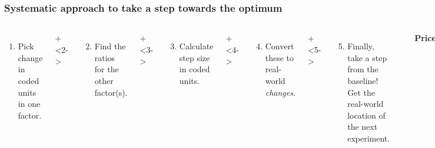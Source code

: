 \begin{frame}\frametitle{Systematic approach to take a step towards the optimum}
	\begin{columns}[T]
		
			\vspace{0.1cm}
			{\tiny 
				\begin{enumerate}
					\item	Pick change in coded units in one factor.
				\end{enumerate}
			 \par}
			\onslide+<2->{
				{\tiny 
					\begin{enumerate}\setcounter{enumi}{1}
						\item	Find the ratios for the other factor(s).
					\end{enumerate}
				
				\par}
			}
			
			\vspace{0.9cm}
			\onslide+<3->{
				{\tiny 
					\begin{enumerate}\setcounter{enumi}{2}
						\item	Calculate step size in coded units.
					\end{enumerate}
				
				\par}
			}
			
			\vspace{0.4cm}
			\onslide+<4->{
				{\tiny 
					\begin{enumerate}\setcounter{enumi}{3}
						\item	Convert these to real-world \emph{changes}.
					\end{enumerate}
				
				\par}
			}
			
			\vspace{1cm}
			\onslide+<5->{
				{\tiny 
					\begin{enumerate}\setcounter{enumi}{4}
						\item	Finally, take a step from the baseline! Get the real-world location
						of the next experiment.
					\end{enumerate}
				
				\par}
			}
				
			\rule[3mm]{0.01cm}{85mm}%
			
			
			\centerline{\textbf{Price}}
			

\end{columns}
\end{frame}
